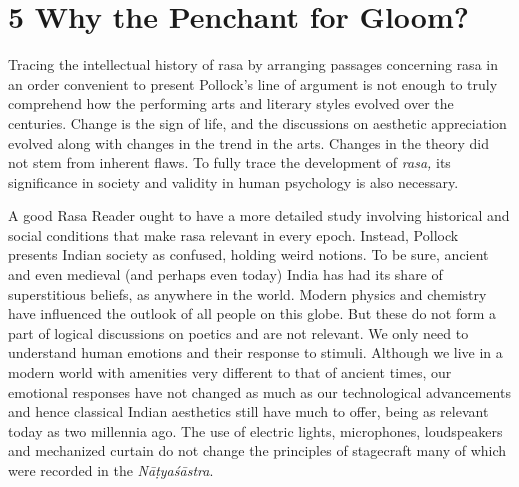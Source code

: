 \section*{5 Why the Penchant for Gloom?}

Tracing the intellectual history of rasa by arranging passages concerning rasa in an order convenient to present Pollock’s line of argument is not enough to truly comprehend how the performing arts and literary styles evolved over the centuries. Change is the sign of life, and the discussions on aesthetic appreciation evolved along with changes in the trend in the arts. Changes in the theory did not stem from inherent flaws. To fully trace the development of \textit{rasa,} its significance in society and validity in human psychology is also necessary.

A good Rasa Reader ought to have a more detailed study involving historical and social conditions that make rasa relevant in every epoch. Instead, Pollock presents Indian society as confused, holding weird notions. To be sure, ancient and even medieval (and perhaps even today) India has had its share of superstitious beliefs, as anywhere in the world. Modern physics and chemistry have influenced the outlook of all people on this globe. But these do not form a part of logical discussions on poetics and are not relevant. We only need to understand human emotions and their response to stimuli. Although we live in a modern world with amenities very different to that of ancient times, our emotional responses have not changed as much as our technological advancements and hence classical Indian aesthetics still have much to offer, being as relevant today as two millennia ago. The use of electric lights, microphones, loudspeakers and mechanized curtain do not change the principles of stagecraft many of which were recorded in the \textit{Nāṭyaśāstra}.

